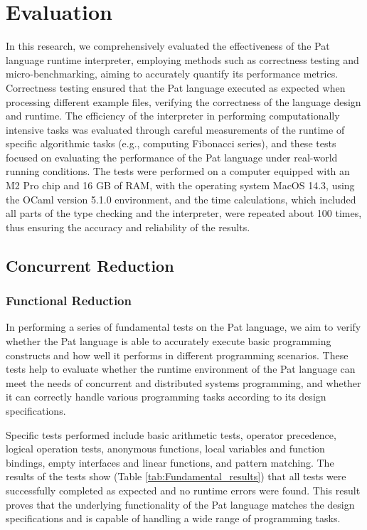 \documentclass{l4proj}
\begin{document}
\chapter{Evaluation} 
In this research, we comprehensively evaluated the effectiveness of the Pat language runtime interpreter, employing methods such as correctness testing and micro-benchmarking, aiming to accurately quantify its performance metrics. Correctness testing ensured that the Pat language executed as expected when processing different example files, verifying the correctness of the language design and runtime. The efficiency of the interpreter in performing computationally intensive tasks was evaluated through careful measurements of the runtime of specific algorithmic tasks (e.g., computing Fibonacci series), and these tests focused on evaluating the performance of the Pat language under real-world running conditions. The tests were performed on a computer equipped with an M2 Pro chip and 16 GB of RAM, with the operating system MacOS 14.3, using the OCaml version 5.1.0 environment, and the time calculations, which included all parts of the type checking and the interpreter, were repeated about 100 times, thus ensuring the accuracy and reliability of the results.

\section{Concurrent Reduction}

\subsection{Functional Reduction}
In performing a series of fundamental tests on the Pat language, we aim to verify whether the Pat language is able to accurately execute basic programming constructs and how well it performs in different programming scenarios. These tests help to evaluate whether the runtime environment of the Pat language can meet the needs of concurrent and distributed systems programming, and whether it can correctly handle various programming tasks according to its design specifications.

Specific tests performed include basic arithmetic tests, operator precedence, logical operation tests, anonymous functions, local variables and function bindings, empty interfaces and linear functions, and pattern matching. The results of the tests show (Table \ref{tab:Fundamental_results}) that all tests were successfully completed as expected and no runtime errors were found. This result proves that the underlying functionality of the Pat language matches the design specifications and is capable of handling a wide range of programming tasks.
\end{document}
